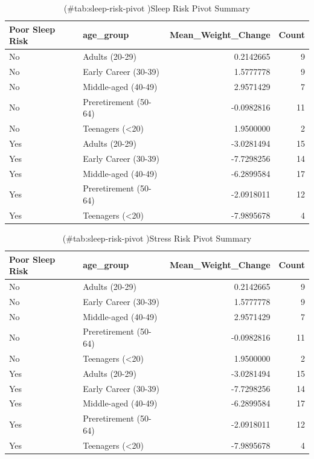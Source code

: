 \documentclass[
  man,floatsintext]{apa6}
\begin{document}
\begin{table}

\caption{(\#tab:sleep-risk-pivot )Sleep Risk Pivot Summary}
\centering
\begin{tabular}[t]{l|l|r|r}
\hline
Poor Sleep Risk & age\_group & Mean\_Weight\_Change & Count\\
\hline
No & Adults (20-29) & 0.2142665 & 9\\
\hline
No & Early Career (30-39) & 1.5777778 & 9\\
\hline
No & Middle-aged (40-49) & 2.9571429 & 7\\
\hline
No & Preretirement (50-64) & -0.0982816 & 11\\
\hline
No & Teenagers (<20) & 1.9500000 & 2\\
\hline
Yes & Adults (20-29) & -3.0281494 & 15\\
\hline
Yes & Early Career (30-39) & -7.7298256 & 14\\
\hline
Yes & Middle-aged (40-49) & -6.2899584 & 17\\
\hline
Yes & Preretirement (50-64) & -2.0918011 & 12\\
\hline
Yes & Teenagers (<20) & -7.9895678 & 4\\
\hline
\end{tabular}
\end{table}

\begin{table}

\caption{(\#tab:sleep-risk-pivot )Stress Risk Pivot Summary}
\centering
\begin{tabular}[t]{l|l|r|r}
\hline
Poor Sleep Risk & age\_group & Mean\_Weight\_Change & Count\\
\hline
No & Adults (20-29) & 0.2142665 & 9\\
\hline
No & Early Career (30-39) & 1.5777778 & 9\\
\hline
No & Middle-aged (40-49) & 2.9571429 & 7\\
\hline
No & Preretirement (50-64) & -0.0982816 & 11\\
\hline
No & Teenagers (<20) & 1.9500000 & 2\\
\hline
Yes & Adults (20-29) & -3.0281494 & 15\\
\hline
Yes & Early Career (30-39) & -7.7298256 & 14\\
\hline
Yes & Middle-aged (40-49) & -6.2899584 & 17\\
\hline
Yes & Preretirement (50-64) & -2.0918011 & 12\\
\hline
Yes & Teenagers (<20) & -7.9895678 & 4\\
\hline
\end{tabular}
\end{table}
\end{document}
